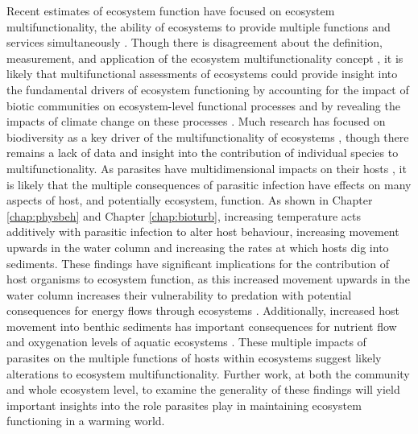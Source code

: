 Recent estimates of ecosystem function have focused on ecosystem multifunctionality, the ability of ecosystems to provide multiple functions and services simultaneously \citep{manning2018}. Though there is disagreement about the definition, measurement, and application of the ecosystem multifunctionality concept \citep{gamfeldt2017, manning2018, meyer2018}, it is likely that multifunctional assessments of ecosystems could provide insight into the fundamental drivers of ecosystem functioning by accounting for the impact of biotic communities on ecosystem-level functional processes \citep{manning2018} and by revealing the impacts of climate change on these processes \citep{traill2010}. Much research has focused on biodiversity as a key driver of the multifunctionality of ecosystems \citep{gamfeldt2017, meyer2018}, though there remains a lack of data and insight into the contribution of individual species to multifunctionality. As parasites have multidimensional impacts on their hosts \citep{thomas2010, cezilly2013}, it is likely that the multiple consequences of parasitic infection have effects on many aspects of host, and potentially ecosystem, function. As shown in Chapter \ref{chap:physbeh} and Chapter \ref{chap:bioturb}, increasing temperature acts additively with parasitic infection to alter host behaviour, increasing movement upwards in the water column and increasing the rates at which hosts dig into sediments. These findings have significant implications for the contribution of host organisms to ecosystem function, as this increased movement upwards in the water column increases their vulnerability to predation \citep{jacquin2014} with potential consequences for energy flows through ecosystems \citep{buck2017}. Additionally, increased host movement into benthic sediments has important consequences for nutrient flow and oxygenation levels of aquatic ecosystems \citep{baranov2016, wohlgemuth2017}. These multiple impacts of parasites on the multiple functions of hosts within ecosystems suggest likely alterations to ecosystem multifunctionality. Further work, at both the community and whole ecosystem level, to examine the generality of these findings will yield important insights into the role parasites play in maintaining ecosystem functioning in a warming world. 

